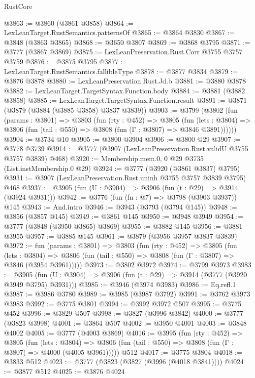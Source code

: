 \begin{lexlean}{RustCore}
\begin{coremodule}
@3863 := @3860 (@3861 @3858)
@3864 := LexLeanTarget.RustSemantics.patternsOf
@3865 := @3864 @3830
@3867 := @3848 (@3863 @3865)
@3868 := @3650 @3807
@3869 := @3868 @3795
@3871 := @3777 (@3867 @3869)
@3875 := LexLeanPreservation.Rust.Corr @3755 @3757 @3759
@3876 := @3875 @3795
@3877 := LexLeanTarget.RustSemantics.fallibleType
@3878 := @3877 @3834
@3879 := @3876 @3878
@3880 := LexLeanPreservation.Rust.Jd.b
@3881 := @3880 @3878
@3882 := LexLeanTarget.TargetSyntax.Function.body
@3884 := @3881 (@3882 @3858)
@3885 := LexLeanTarget.TargetSyntax.Function.result
@3891 := @3871 (@3879 (@3884 (@3885 @3858) @3837 @3839))
@3903 := @3799
    (@3802
      (fun (params : @3801) =>
      @3803
        (fun (rty : @452) =>
        @3805
          (fun (lets : @3804) =>
          @3806 (fun (tail : @550) => @3808 (fun (Γ : @3807) => @3846 @3891))))))
@3904 := @3734 @10
@3905 := @3800 @3904
@3906 := @3800 @29
@3907 := @3778 @3739
@3914 := @3777 (@3907 (LexLeanPreservation.Rust.validU @3755 @3757 @3839) @468)
@3920 := Membership.mem.{0, 0} @29 @3735 (List.instMembership.{0} @29)
@3924 := @3777 (@3920 (@3861 @3837) @3795)
@3931 := @3907 (LexLeanPreservation.Rust.uninh @3755 @3757 @3839 @3795) @468
@3937 := @3905 (fun (U : @3904) => @3906 (fun (t : @29) => @3914 (@3924 @3931)))
@3942 := @3776 (fun (fn : @7) => @3798 (@3903 @3937)) @145
@3943 := And.intro
@3946 := @3943 (@3793 (@3794 @145))
@3948 := @3856 (@3857 @145)
@3949 := @3861 @145
@3950 := @3948 @3949
@3954 := @3777 (@3848 (@3950 @3865) @3869)
@3955 := @3882 @145
@3956 := @3881 @3955
@3957 := @3885 @145
@3961 := @3879 (@3956 @3957 @3837 @3839)
@3972 := fun (params : @3801) =>
  @3803
    (fun (rty : @452) =>
    @3805
      (fun (lets : @3804) =>
      @3806 (fun (tail : @550) => @3808 (fun (Γ : @3807) => @3846 (@3954 @3961)))))
@3973 := @3802 @3972
@3974 := @3799 @3973
@3983 := @3905 (fun (U : @3904) => @3906 (fun (t : @29) => @3914 (@3777 (@3920 @3949 @3795) @3931)))
@3985 := @3946 (@3974 @3983)
@3986 := Eq.refl.{1}
@3987 := @3986 @3780
@3989 := @3985 (@3987 @3792)
@3991 := @3762 @3973 @3983
@3992 := @3775 @3801
@3994 := @3992 @3972 @507
@3995 := @3775 @452
@3996 := @3829 @507
@3998 := @3827 (@3996 @3842)
@4000 := @3777 (@3823 @3998)
@4001 := @3864 @507
@4002 := @3950 @4001
@4003 := @3848 @4002
@4005 := @3777 (@4003 @3869)
@4016 := @3995
    (fun (rty : @452) =>
    @3805
      (fun (lets : @3804) =>
      @3806 (fun (tail : @550) => @3808 (fun (Γ : @3807) => @4000 (@4005 @3961)))))
    @512
@4017 := @3775 @3804
@4018 := @3833 @512
@4023 := @3777 (@3823 (@3827 (@3996 (@4018 @3841))))
@4024 := @3877 @512
@4025 := @3876 @4024

\end{coremodule}
\end{lexlean}
